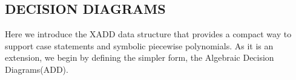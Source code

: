 \subsection {\bf DECISION DIAGRAMS}
Here we introduce the XADD data structure that provides a compact way to support case statements and symbolic piecewise polynomials. As it is an extension, we begin by defining the simpler form, the Algebraic Decision Diagrams(ADD).

